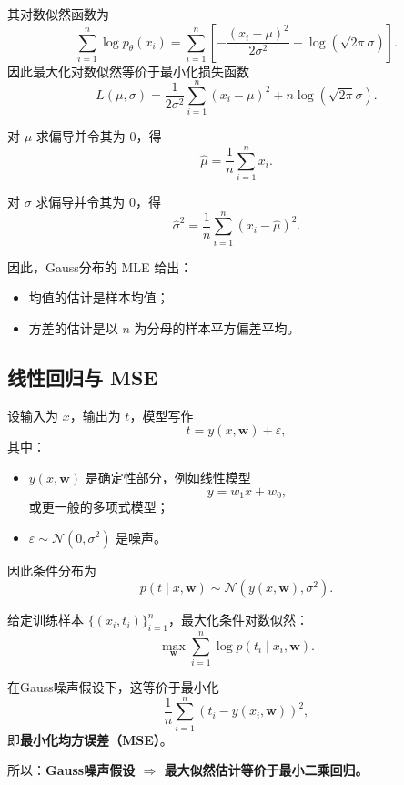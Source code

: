 其对数似然函数为
\[
\sum_{i=1}^n \log p_\theta(x_i)
=
\sum_{i=1}^n
\left[
-\frac{(x_i-\mu)^2}{2\sigma^2}
-\log(\sqrt{2\pi}\sigma)
\right].
\]
因此最大化对数似然等价于最小化损失函数
\[
L(\mu,\sigma)=
\frac{1}{2\sigma^2}\sum_{i=1}^n (x_i-\mu)^2
+n\log(\sqrt{2\pi}\sigma).
\]

对 \(\mu\) 求偏导并令其为 \(0\)，得
\[
\hat{\mu}
=
\frac{1}{n}\sum_{i=1}^n x_i.
\]

对 \(\sigma\) 求偏导并令其为 \(0\)，得
\[
\hat{\sigma}^2
=
\frac{1}{n}\sum_{i=1}^n (x_i-\hat{\mu})^2.
\]

因此，Gauss分布的 MLE 给出：
\begin{itemize}
    \item 均值的估计是样本均值；
    \item 方差的估计是以 \(n\) 为分母的样本平方偏差平均。
\end{itemize}

\subsection{线性回归与 MSE}

设输入为 \(x\)，输出为 \(t\)，模型写作
\[
t=y(x,\mathbf{w})+\varepsilon,
\]
其中：
\begin{itemize}
    \item \(y(x,\mathbf{w})\) 是确定性部分，例如线性模型
    \[
    y=w_1x+w_0,
    \]
    或更一般的多项式模型；
    \item \(\varepsilon\sim \mathcal{N}(0,\sigma^2)\) 是噪声。
\end{itemize}
因此条件分布为
\[
p(t\mid x,\mathbf{w})\sim \mathcal{N}(y(x,\mathbf{w}),\sigma^2).
\]

给定训练样本 \(\{(x_i,t_i)\}_{i=1}^n\)，最大化条件对数似然：
\[
\max_{\mathbf{w}} \sum_{i=1}^n \log p(t_i\mid x_i,\mathbf{w}).
\]

在Gauss噪声假设下，这等价于最小化
\[
\frac{1}{n}\sum_{i=1}^n \left(t_i-y(x_i,\mathbf{w})\right)^2,
\]
即\textbf{最小化均方误差（MSE）}。

所以：\textbf{Gauss噪声假设 \(\Longrightarrow\) 最大似然估计等价于最小二乘回归。}